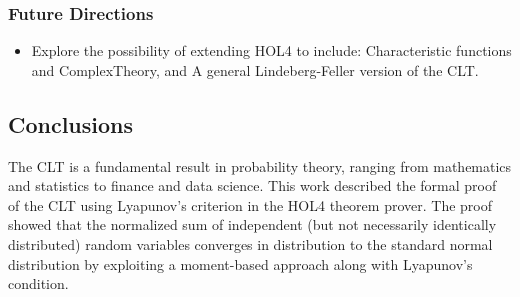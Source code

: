 \subsubsection{Future Directions}
\begin{itemize}
    \item Explore the possibility of extending HOL4 to include: Characteristic functions and ComplexTheory, and A general Lindeberg-Feller version of the CLT.    
\end{itemize}


\subsection{Conclusions}
The CLT is a fundamental result in probability theory, ranging from mathematics and statistics to finance and data science. This work described the formal proof of the CLT using Lyapunov's criterion in the HOL4 theorem prover. The proof showed that the normalized sum of independent (but not necessarily identically distributed) random variables converges in distribution to the standard normal distribution by exploiting a moment-based approach along with Lyapunov's condition.

